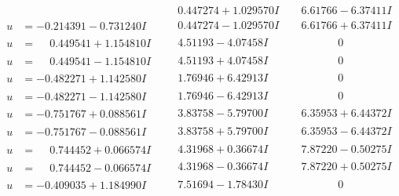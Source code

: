 \documentclass[1p]{elsarticle_modified}
\theoremstyle{definition}
\begin{document}
$$\begin{array}{c|c|c}
 & \phantom{-}0.447274 + 1.029570 I & \phantom{-}6.61766 - 6.37411 I \\ \hline\begin{aligned}
u &= -0.214391 - 0.731240 I\end{aligned}
 & \phantom{-}0.447274 - 1.029570 I & \phantom{-}6.61766 + 6.37411 I \\ \hline\begin{aligned}
u &= \phantom{-}0.449541 + 1.154810 I\end{aligned}
 & \phantom{-}4.51193 - 4.07458 I & \phantom{-0.000000 } 0 \\ \hline\begin{aligned}
u &= \phantom{-}0.449541 - 1.154810 I\end{aligned}
 & \phantom{-}4.51193 + 4.07458 I & \phantom{-0.000000 } 0 \\ \hline\begin{aligned}
u &= -0.482271 + 1.142580 I\end{aligned}
 & \phantom{-}1.76946 + 6.42913 I & \phantom{-0.000000 } 0 \\ \hline\begin{aligned}
u &= -0.482271 - 1.142580 I\end{aligned}
 & \phantom{-}1.76946 - 6.42913 I & \phantom{-0.000000 } 0 \\ \hline\begin{aligned}
u &= -0.751767 + 0.088561 I\end{aligned}
 & \phantom{-}3.83758 - 5.79700 I & \phantom{-}6.35953 + 6.44372 I \\ \hline\begin{aligned}
u &= -0.751767 - 0.088561 I\end{aligned}
 & \phantom{-}3.83758 + 5.79700 I & \phantom{-}6.35953 - 6.44372 I \\ \hline\begin{aligned}
u &= \phantom{-}0.744452 + 0.066574 I\end{aligned}
 & \phantom{-}4.31968 + 0.36674 I & \phantom{-}7.87220 - 0.50275 I \\ \hline\begin{aligned}
u &= \phantom{-}0.744452 - 0.066574 I\end{aligned}
 & \phantom{-}4.31968 - 0.36674 I & \phantom{-}7.87220 + 0.50275 I \\ \hline\begin{aligned}
u &= -0.409035 + 1.184990 I\end{aligned}
 & \phantom{-}7.51694 - 1.78430 I & \phantom{-0.000000 } 0 \\ \hline\begin{aligned}

\end{aligned}
\end{array}$$
\end{document}
